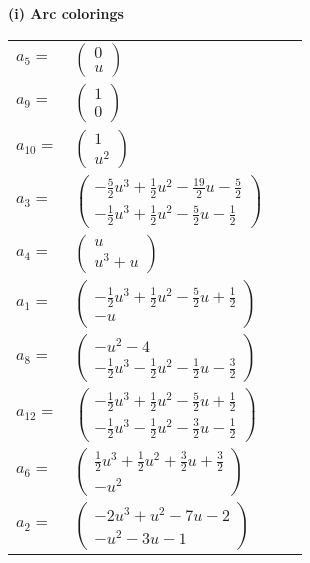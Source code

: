 \documentclass[1p]{elsarticle_modified}
\theoremstyle{definition}
\begin{document}
\flushleft \textbf{(i) Arc colorings}\\
\begin{tabular}{m{7pt} m{180pt} m{7pt} m{180pt} }
\flushright $a_{5}=$&$\begin{pmatrix}0\\u\end{pmatrix}$ \\
\flushright $a_{9}=$&$\begin{pmatrix}1\\0\end{pmatrix}$ \\
\flushright $a_{10}=$&$\begin{pmatrix}1\\u^2\end{pmatrix}$ \\
\flushright $a_{3}=$&$\begin{pmatrix}-\frac{5}{2} u^3+\frac{1}{2} u^2-\frac{19}{2} u-\frac{5}{2}\\-\frac{1}{2} u^3+\frac{1}{2} u^2-\frac{5}{2} u-\frac{1}{2}\end{pmatrix}$ \\
\flushright $a_{4}=$&$\begin{pmatrix}u\\u^3+u\end{pmatrix}$ \\
\flushright $a_{1}=$&$\begin{pmatrix}-\frac{1}{2} u^3+\frac{1}{2} u^2-\frac{5}{2} u+\frac{1}{2}\\- u\end{pmatrix}$ \\
\flushright $a_{8}=$&$\begin{pmatrix}- u^2-4\\-\frac{1}{2} u^3-\frac{1}{2} u^2-\frac{1}{2} u-\frac{3}{2}\end{pmatrix}$ \\
\flushright $a_{12}=$&$\begin{pmatrix}-\frac{1}{2} u^3+\frac{1}{2} u^2-\frac{5}{2} u+\frac{1}{2}\\-\frac{1}{2} u^3-\frac{1}{2} u^2-\frac{3}{2} u-\frac{1}{2}\end{pmatrix}$ \\
\flushright $a_{6}=$&$\begin{pmatrix}\frac{1}{2} u^3+\frac{1}{2} u^2+\frac{3}{2} u+\frac{3}{2}\\- u^2\end{pmatrix}$ \\
\flushright $a_{2}=$&$\begin{pmatrix}-2 u^3+u^2-7 u-2\\- u^2-3 u-1\end{pmatrix}$ \\

\end{tabular}
\end{document}
